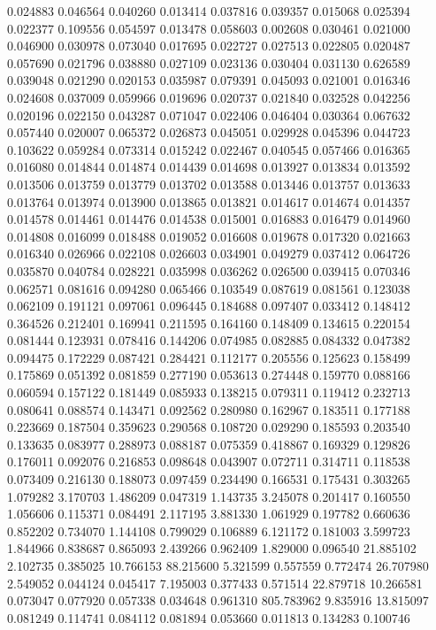 0.024883
0.046564
0.040260
0.013414
0.037816
0.039357
0.015068
0.025394
0.022377
0.109556
0.054597
0.013478
0.058603
0.002608
0.030461
0.021000
0.046900
0.030978
0.073040
0.017695
0.022727
0.027513
0.022805
0.020487
0.057690
0.021796
0.038880
0.027109
0.023136
0.030404
0.031130
0.626589
0.039048
0.021290
0.020153
0.035987
0.079391
0.045093
0.021001
0.016346
0.024608
0.037009
0.059966
0.019696
0.020737
0.021840
0.032528
0.042256
0.020196
0.022150
0.043287
0.071047
0.022406
0.046404
0.030364
0.067632
0.057440
0.020007
0.065372
0.026873
0.045051
0.029928
0.045396
0.044723
0.103622
0.059284
0.073314
0.015242
0.022467
0.040545
0.057466
0.016365
0.016080
0.014844
0.014874
0.014439
0.014698
0.013927
0.013834
0.013592
0.013506
0.013759
0.013779
0.013702
0.013588
0.013446
0.013757
0.013633
0.013764
0.013974
0.013900
0.013865
0.013821
0.014617
0.014674
0.014357
0.014578
0.014461
0.014476
0.014538
0.015001
0.016883
0.016479
0.014960
0.014808
0.016099
0.018488
0.019052
0.016608
0.019678
0.017320
0.021663
0.016340
0.026966
0.022108
0.026603
0.034901
0.049279
0.037412
0.064726
0.035870
0.040784
0.028221
0.035998
0.036262
0.026500
0.039415
0.070346
0.062571
0.081616
0.094280
0.065466
0.103549
0.087619
0.081561
0.123038
0.062109
0.191121
0.097061
0.096445
0.184688
0.097407
0.033412
0.148412
0.364526
0.212401
0.169941
0.211595
0.164160
0.148409
0.134615
0.220154
0.081444
0.123931
0.078416
0.144206
0.074985
0.082885
0.084332
0.047382
0.094475
0.172229
0.087421
0.284421
0.112177
0.205556
0.125623
0.158499
0.175869
0.051392
0.081859
0.277190
0.053613
0.274448
0.159770
0.088166
0.060594
0.157122
0.181449
0.085933
0.138215
0.079311
0.119412
0.232713
0.080641
0.088574
0.143471
0.092562
0.280980
0.162967
0.183511
0.177188
0.223669
0.187504
0.359623
0.290568
0.108720
0.029290
0.185593
0.203540
0.133635
0.083977
0.288973
0.088187
0.075359
0.418867
0.169329
0.129826
0.176011
0.092076
0.216853
0.098648
0.043907
0.072711
0.314711
0.118538
0.073409
0.216130
0.188073
0.097459
0.234490
0.166531
0.175431
0.303265
1.079282
3.170703
1.486209
0.047319
1.143735
3.245078
0.201417
0.160550
1.056606
0.115371
0.084491
2.117195
3.881330
1.061929
0.197782
0.660636
0.852202
0.734070
1.144108
0.799029
0.106889
6.121172
0.181003
3.599723
1.844966
0.838687
0.865093
2.439266
0.962409
1.829000
0.096540
21.885102
2.102735
0.385025
10.766153
88.215600
5.321599
0.557559
0.772474
26.707980
2.549052
0.044124
0.045417
7.195003
0.377433
0.571514
22.879718
10.266581
0.073047
0.077920
0.057338
0.034648
0.961310
805.783962
9.835916
13.815097
0.081249
0.114741
0.084112
0.081894
0.053660
0.011813
0.134283
0.100746
